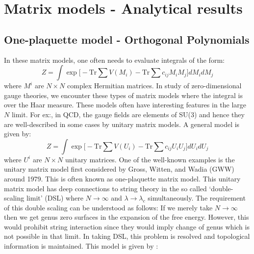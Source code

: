 \documentclass[11pt]{article}
\begin{document}
\section{\label{sec:MMAres}Matrix models - Analytical results} 

\subsection{One-plaquette model - Orthogonal Polynomials} 
In these matrix models, one often needs to evaluate integrals of the form:
\begin{equation}
Z = \int \exp\Bigg[  -\mathrm{Tr} \sum V(M_{i})  -  \mathrm{Tr} \sum c_{ij}M_{i}M_{j}   \Bigg] dM_{i} dM_{j}
\end{equation}
where $M^{i}$ are $N \times N$ complex Hermitian matrices. 
In study of zero-dimensional gauge theories, we encounter these types of matrix models where the integral is over the Haar measure. These models often have interesting features in the large $N$ limit.
For ex:, in QCD, the gauge fields are elements of SU(3) and hence they are well-described in some cases by unitary matrix models. A general model is given by:
\begin{equation}
	Z = \int \exp\Bigg[  -\mbox{Tr} \sum V(U_{i})  -  \mbox{Tr} \sum c_{ij}U_{i}U_{j}   \Bigg] dU_{i} dU_{j}
\end{equation}
where $U^{i}$ are $N \times N$ unitary matrices. 
One of the well-known examples is the unitary matrix model first considered by Gross, Witten, and Wadia (GWW) around 1979. This is often known as one-plaquette matrix model. This unitary matrix model has deep connections to string theory in the so called `double-scaling limit' (DSL) where $N \to \infty$ and $\lambda \to \lambda_{c}$ simultaneously. The requirement of this double scaling can be understood as follows: If we merely take $N \to \infty$ then we get genus zero surfaces in the expansion of the free energy. However, this would prohibit string interaction since they would imply change of genus which is not possible in that limit. In taking DSL, this problem is resolved and topological information is maintained. This model is given by : 
\end{document}
